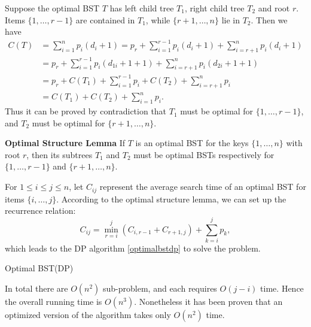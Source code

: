 Suppose the optimal BST $T$ has left child tree $T_1$, right child tree $T_2$ and root $r$. Items $\{1,\dots,r-1\}$ are contained in $T_1$, while $\{r+1,\dots,n\}$ lie in $T_2$. Then we have
\begin{align*}
C(T)&=\sum\limits_{i=1}^np_i(d_i+1)=p_r + \sum\limits_{i=1}^{r-1}p_i(d_i+1) + \sum\limits_{i=r+1}^{n}p_i(d_i+1)\\
&=p_r+\sum\limits_{i=1}^{r-1}p_i(d_{1i}+1 + 1) + \sum\limits_{i=r+1}^{n}p_i(d_{2i}+1 + 1)\\
&=p_r+C(T_1)+\sum\limits_{i=1}^{r-1}p_i + C(T_2)+\sum\limits_{i=r+1}^{n}p_i\\
&=C(T_1)+C(T_2)+\sum\limits_{i=1}^{n}p_i.
\end{align*}
Thus it can be proved by contradiction that $T_1$ must be optimal for $\{1,\dots,r-1\}$, and $T_2$ must be optimal for $\{r+1,\dots,n\}$. 
\begin{lemma}\textbf{Optimal Structure Lemma}
If $T$ is an optimal BST for the keys $\{1,\dots,n\}$ with root $r$, then its subtrees $T_1$ and $T_2$ must be optimal BSTs respectively for $\{1,\dots,r-1\}$ and $\{r+1,\dots,n\}$.
\end{lemma}
For $1\leq i\leq j\leq n$, let $C_{ij}$ represent the average search time of an optimal BST for items $\{i,\dots,j\}$. According to the optimal structure lemma, we can set up the recurrence relation:
\begin{equation*}
C_{ij}=\min\limits_{r=i}^j\left(C_{i,r-1}+C_{r+1,j}\right)+\sum\limits_{k=i}^jp_k,
\end{equation*}
which leads to the DP algorithm \ref{optimalbstdp} to solve the problem.
\begin{algorithm}[ht]
\caption{Optimal BST(DP)}\label{optimalbstdp}
\begin{algorithmic}[1]
\EndFor\EndFor
\end{algorithmic}
\end{algorithm}

In total there are $O(n^2)$ sub-problem, and each requires $O(j-i)$ time. Hence the overall running time is $O(n^3)$. Nonetheless it has been proven that an optimized version of the algorithm takes only $O(n^2)$ time.
